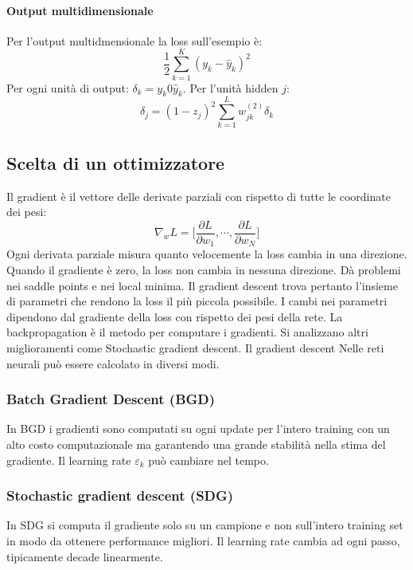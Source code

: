 			\paragraph{Output multidimensionale}
			Per l'output multidmensionale la loss sull'esempio \`e:
			$$\frac{1}{2}\sum\limits_{k = 1}^K(y_k-\hat{y}_k)^2$$
			Per ogni unit\`a di output: $\delta_k = y_k 0 \hat{y}_k$.
			Per l'unit\`a hidden $j$:
			$$\delta_j = (1-z_j)^2\sum\limits_{k=1}^Lw_{jk}^{(2)}\delta_k$$








	\subsection{Scelta di un ottimizzatore}
	Il gradient \`e il vettore delle derivate parziali con rispetto di tutte le coordinate dei pesi:
	$$\nabla_w L = \bigl[\frac{\partial L}{\partial w_1}, \cdots, \frac{\partial L}{\partial w_N}\bigr]$$
	Ogni derivata parziale misura quanto velocemente la loss cambia in una direzione.
	Quando il gradiente \`e zero, la loss non cambia in nessuna direzione.
	D\`a problemi nei saddle points e nei local minima.
	Il gradient descent trova pertanto l'insieme di parametri che rendono la loss il pi\`u piccola possibile.
	I cambi nei parametri dipendono dal gradiente della loss con rispetto dei pesi della rete.
	La backpropagation \`e il metodo per computare i gradienti.
	Si analizzano altri miglioramenti come Stochastic gradient descent.
	Il gradient descent Nelle reti neurali pu\`o essere calcolato in diversi modi.

		\subsubsection{Batch Gradient Descent (BGD)}
		In BGD i gradienti sono computati su ogni update per l'intero training con un alto costo computazionale ma garantendo una grande stabilit\`a nella stima del gradiente.
		Il learning rate $\varepsilon_k$ pu\`o cambiare nel tempo.\\
		

		\subsubsection{Stochastic gradient descent (SDG)}
		In SDG si computa il gradiente solo su un campione e non sull'intero training set in modo da ottenere performance migliori.
		Il learning rate cambia ad ogni passo, tipicamente decade linearmente.
		

